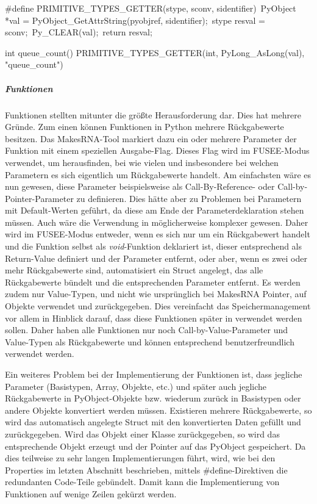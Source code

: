 \begin{code}[caption={Beispiel für die Vereinfachung durch \#define-Direktiven},label={lst:getdef}]
#define PRIMITIVE_TYPES_GETTER(stype, sconv, sidentifier)\
	PyObject *val = PyObject_GetAttrString(pyobjref, sidentifier);\
	stype resval = sconv;\
	Py_CLEAR(val);\
	return resval;
\end{code}

\begin{code}[caption={Beispiel für die Implementierung einer Getter-Funktion},label={lst:getimp}]
int queue_count() {
	PRIMITIVE_TYPES_GETTER(int, PyLong_AsLong(val),                 "queue_count")
}
\end{code}

\subparagraph{Funktionen}

Funktionen stellten mitunter die größte Herausforderung dar. Dies hat mehrere Gründe. Zum einen können Funktionen in Python mehrere Rückgabewerte besitzen. Das MakesRNA-Tool markiert dazu ein oder mehrere Parameter der Funktion mit einem speziellen Ausgabe-Flag. Dieses Flag wird im FUSEE-Modus verwendet, um herausfinden, bei wie vielen und insbesondere bei welchen Parametern es sich eigentlich um Rückgabewerte handelt. Am einfachsten wäre es nun gewesen, diese Parameter beispielsweise als Call-By-Reference- oder Call-by-Pointer-Parameter zu definieren. Dies hätte aber zu Problemen bei Parametern mit Default-Werten geführt, da diese am Ende der Parameterdeklaration stehen müssen. Auch wäre die Verwendung in \CS{} möglicherweise komplexer gewesen. Daher wird im FUSEE-Modus entweder, wenn es sich nur um ein Rückgabewert handelt und die Funktion selbst als \emph{void}-Funktion deklariert ist, dieser entsprechend als Return-Value definiert und der Parameter entfernt, oder aber, wenn es zwei oder mehr Rückgabewerte sind, automatisiert ein Struct angelegt, das alle Rückgabewerte bündelt und die entsprechenden Parameter entfernt. Es werden zudem nur Value-Typen, und nicht wie ursprünglich bei MakesRNA Pointer, auf Objekte verwendet und zurückgegeben. Dies vereinfacht das Speichermanagement vor allem in Hinblick darauf, dass diese Funktionen später in \CS verwendet werden sollen. Daher haben alle Funktionen nur noch Call-by-Value-Parameter und Value-Typen als Rückgabewerte und können entsprechend benutzerfreundlich verwendet werden. 

Ein weiteres Problem bei der Implementierung der Funktionen ist, dass jegliche Parameter (Basistypen, Array, Objekte, etc.) und später auch jegliche Rückgabewerte in PyObject-Objekte bzw. wiederum zurück in Basistypen oder andere Objekte konvertiert werden müssen. Existieren mehrere Rückgabewerte, so wird das automatisch angelegte Struct mit den konvertierten Daten gefüllt und zurückgegeben. Wird das Objekt einer Klasse zurückgegeben, so wird das entsprechende Objekt erzeugt und der Pointer auf das PyObject gespeichert. Da dies teilweise zu sehr langen Implementierungen führt, wird, wie bei den Properties im letzten Abschnitt beschrieben, mittels \#define-Direktiven die redundanten Code-Teile gebündelt. Damit kann die Implementierung von Funktionen auf wenige Zeilen gekürzt werden.

